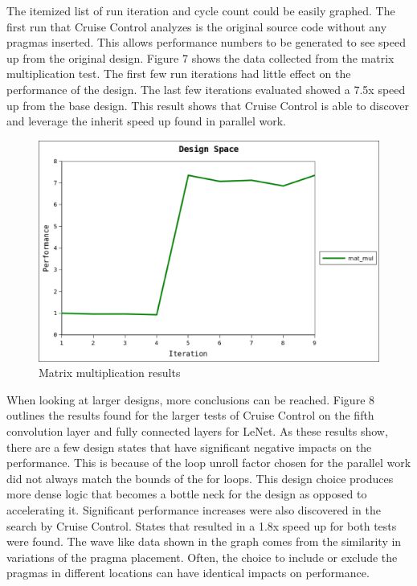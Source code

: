 \documentclass[letterpaper, 10 pt, conference]{IEEEconf}  %
\begin{document}
The itemized list of run iteration and cycle count could be easily graphed. The first run that Cruise Control analyzes is the original source code without any pragmas inserted. This allows performance numbers to be generated to see speed up from the original design. Figure 7 shows the data collected from the matrix multiplication test. The first few run iterations had little effect on the performance of the design. The last few iterations evaluated showed a 7.5x speed up from the base design. This result shows that Cruise Control is able to discover and leverage the inherit speed up found in parallel work. \newline 

\begin{figure}[H]
\centering
\includegraphics[scale=.43]{result1.png} 
\caption{Matrix multiplication results}
\end{figure}

When looking at larger designs, more conclusions can be reached. Figure 8 outlines the results found for the larger tests of Cruise Control on the fifth convolution layer and fully connected layers for LeNet. As these results show, there are a few design states that have significant negative impacts on the performance. This is because of the loop unroll factor chosen for the parallel work did not always match the bounds of the for loops. This design choice produces more dense logic that becomes a bottle neck for the design as opposed to accelerating it. Significant performance increases were also discovered in the search by Cruise Control. States that resulted in a 1.8x speed up for both tests were found. The wave like data shown in the graph comes from the similarity in variations of the pragma placement. Often, the choice to include or exclude the pragmas in different locations can have identical impacts on performance. \newline
\end{document}
